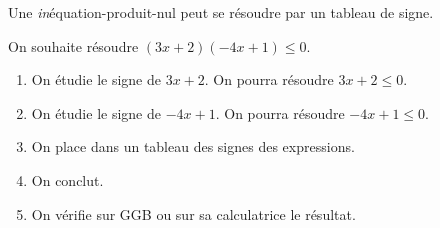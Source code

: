 \begin{Mt}
Une \textit{in}équation-produit-nul peut se résoudre par un tableau de signe.
\end{Mt}


On souhaite résoudre $(3x+2)(-4x+1) \leq  0$.

\begin{Mt}
\begin{enumerate}
\item On étudie le signe de $3x+2$. On pourra résoudre $3x+2 \leq  0$.
\item On étudie le signe de $-4x+1$. On pourra résoudre $-4x+1 \leq  0$.
\item On place dans un tableau des signes des expressions.
\item On conclut.
\item On vérifie sur GGB ou sur sa calculatrice le résultat.
\end{enumerate}
\end{Mt}


